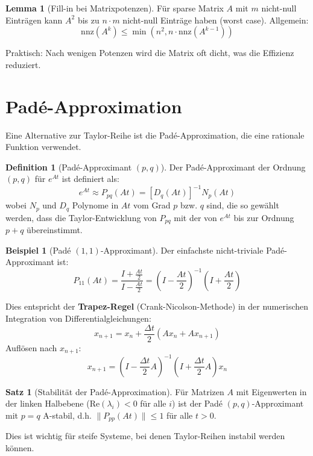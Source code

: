 ﻿\documentclass[a4paper,12pt]{report}
\theoremstyle{definition}
\newtheorem{definition}{Definition}
\newtheorem{beispiel}{Beispiel}
\newtheorem{satz}{Satz}
\newtheorem{lemma}{Lemma}
\begin{document}
	\begin{lemma}[Fill-in bei Matrixpotenzen]
		Für sparse Matrix $A$ mit $m$ nicht-null Einträgen kann $A^2$ bis zu $n \cdot m$ nicht-null Einträge haben (worst case). Allgemein:
		\[
		\text{nnz}(A^k) \leq \min(n^2, n \cdot \text{nnz}(A^{k-1}))
		\]
		
		Praktisch: Nach wenigen Potenzen wird die Matrix oft dicht, was die Effizienz reduziert.
	\end{lemma}
	
	\section{Padé-Approximation}
	
	Eine Alternative zur Taylor-Reihe ist die Padé-Approximation, die eine rationale Funktion verwendet.
	
	\begin{definition}[Padé-Approximant $(p,q)$]
		Der Padé-Approximant der Ordnung $(p,q)$ für $e^{At}$ ist definiert als:
		\[
		e^{At} \approx P_{pq}(At) = \left[ D_q(At) \right]^{-1} N_p(At)
		\]
		wobei $N_p$ und $D_q$ Polynome in $At$ vom Grad $p$ bzw. $q$ sind, die so gewählt werden, dass die Taylor-Entwicklung von $P_{pq}$ mit der von $e^{At}$ bis zur Ordnung $p+q$ übereinstimmt.
	\end{definition}
	
	\begin{beispiel}[Padé $(1,1)$-Approximant]
		Der einfachste nicht-triviale Padé-Approximant ist:
		\[
		P_{11}(At) = \frac{I + \frac{At}{2}}{I - \frac{At}{2}} = \left(I - \frac{At}{2}\right)^{-1} \left(I + \frac{At}{2}\right)
		\]
		
		Dies entspricht der \textbf{Trapez-Regel} (Crank-Nicolson-Methode) in der numerischen Integration von Differentialgleichungen:
		\[
		x_{n+1} = x_n + \frac{\Delta t}{2}(Ax_n + Ax_{n+1})
		\]
		Auflösen nach $x_{n+1}$:
		\[
		x_{n+1} = \left(I - \frac{\Delta t}{2} A\right)^{-1} \left(I + \frac{\Delta t}{2} A\right) x_n
		\]
	\end{beispiel}
	
	\begin{satz}[Stabilität der Padé-Approximation]
		Für Matrizen $A$ mit Eigenwerten in der linken Halbebene ($\text{Re}(\lambda_i) < 0$ für alle $i$) ist der Padé $(p,q)$-Approximant mit $p = q$ A-stabil, d.h. $\|P_{pp}(At)\| \leq 1$ für alle $t > 0$.
		
		Dies ist wichtig für steife Systeme, bei denen Taylor-Reihen instabil werden können.
	\end{satz}
	
\end{document}
